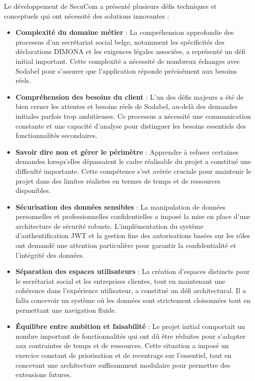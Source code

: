 \documentclass[12pt,a4paper]{report}
\begin{document}
Le développement de SecuCom a présenté plusieurs défis techniques et conceptuels qui ont nécessité des solutions innovantes :

\begin{itemize}
  \item \textbf{Complexité du domaine métier} : La compréhension approfondie des processus d'un secrétariat social belge, notamment les spécificités des déclarations DIMONA et les exigences légales associées, a représenté un défi initial important. Cette complexité a nécessité de nombreux échanges avec Sodabel pour s'assurer que l'application réponde précisément aux besoins réels.

  \item \textbf{Compréhension des besoins du client} : L'un des défis majeurs a été de bien cerner les attentes et besoins réels de Sodabel, au-delà des demandes initiales parfois trop ambitieuses. Ce processus a nécessité une communication constante et une capacité d'analyse pour distinguer les besoins essentiels des fonctionnalités secondaires.

  \item \textbf{Savoir dire non et gérer le périmètre} : Apprendre à refuser certaines demandes lorsqu'elles dépassaient le cadre réalisable du projet a constitué une difficulté importante. Cette compétence s'est avérée cruciale pour maintenir le projet dans des limites réalistes en termes de temps et de ressources disponibles.

  \item \textbf{Sécurisation des données sensibles} : La manipulation de données personnelles et professionnelles confidentielles a imposé la mise en place d'une architecture de sécurité robuste. L'implémentation du système d'authentification JWT et la gestion fine des autorisations basées sur les rôles ont demandé une attention particulière pour garantir la confidentialité et l'intégrité des données.

  \item \textbf{Séparation des espaces utilisateurs} : La création d'espaces distincts pour le secrétariat social et les entreprises clientes, tout en maintenant une cohérence dans l'expérience utilisateur, a constitué un défi architectural. Il a fallu concevoir un système où les données sont strictement cloisonnées tout en permettant une navigation fluide.

  \item \textbf{Équilibre entre ambition et faisabilité} : Le projet initial comportait un nombre important de fonctionnalités qui ont dû être réduites pour s'adapter aux contraintes de temps et de ressources. Cette situation a imposé un exercice constant de priorisation et de recentrage sur l'essentiel, tout en concevant une architecture suffisamment modulaire pour permettre des extensions futures.
\end{itemize}
\end{document}
